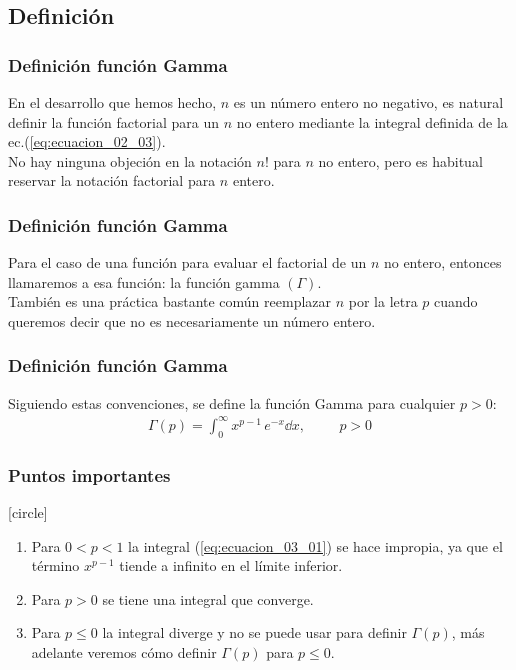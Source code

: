 \subsection{Definición}
\begin{frame}
\frametitle{Definición función Gamma}
En el desarrollo que hemos hecho, $n$ es un número entero no negativo, es natural definir la función factorial para un $n$ no entero mediante la integral definida de la ec.(\ref{eq:ecuacion_02_03}).
\\
\bigskip
\pause
No hay ninguna objeción en la notación $n!$ para $n$ no entero, pero es habitual reservar la notación factorial para $n$ entero.
\end{frame}
\begin{frame}
\frametitle{Definición función Gamma}
Para el caso de una función para evaluar el factorial de un $n$ no entero, entonces llamaremos a esa función: la función gamma $(\Gamma)$.
\\
\bigskip
\pause
También es una práctica bastante común reemplazar $n$ por la letra $p$ cuando queremos decir que no es necesariamente un número entero.
\end{frame}
\begin{frame}
\frametitle{Definición función Gamma}
Siguiendo estas convenciones, se define la función Gamma para cualquier $p > 0$:
\begin{align}
\boxed{\Gamma (p) = \int_{0}^{\infty} x^{p-1} \, e^{-x} \dd{x}, \hspace{1cm} p > 0}
\label{eq:ecuacion_03_01}
\end{align}
\end{frame}
\begin{frame}
\frametitle{Puntos importantes}
[circle]
\begin{enumerate}[<+->]
\item Para $0 < p < 1$ la integral (\ref{eq:ecuacion_03_01}) se hace impropia, ya que el término $x^{p-1}$ tiende a infinito en el límite inferior.
\item Para $p > 0$ se tiene una integral que converge.
\item Para $p \leq 0$ la integral diverge y no se puede usar para definir $\Gamma (p)$, más adelante veremos cómo definir  $\Gamma (p)$ para $p \leq 0$.
\end{enumerate}
\end{frame}
